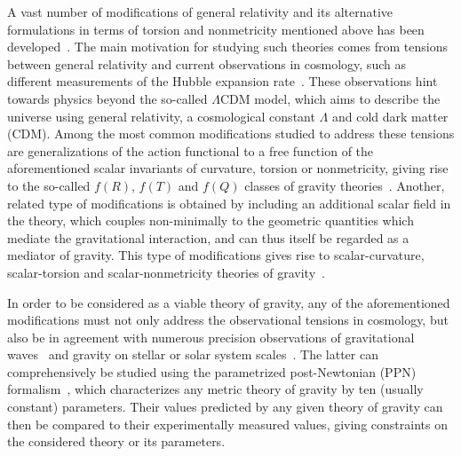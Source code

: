 \documentclass[notitlepage,a4paper,aps,prd,onecolumn,superscriptaddress,nofootinbib,groupedaddress,longbibliography]{revtex4-2}
\begin{document}
A vast number of modifications of general relativity and its alternative formulations in terms of torsion and nonmetricity mentioned above has been developed~\cite{CANTATA:2021ktz}. The main motivation for studying such theories comes from tensions between general relativity and current observations in cosmology, such as different measurements of the Hubble expansion rate~\cite{Planck:2018vyg}. These observations hint towards physics beyond the so-called $\Lambda$CDM model, which aims to describe the universe using general relativity, a cosmological constant \(\Lambda\) and cold dark matter (CDM). Among the most common modifications studied to address these tensions are generalizations of the action functional to a free function of the aforementioned scalar invariants of curvature, torsion or nonmetricity, giving rise to the so-called $f(R)$, $f(T)$ and $f(Q)$ classes of gravity theories~\cite{Sotiriou:2008rp,Bengochea:2008gz,Linder:2010py,BeltranJimenez:2017tkd,BeltranJimenez:2018vdo}. Another, related type of modifications is obtained by including an additional scalar field in the theory, which couples non-minimally to the geometric quantities which mediate the gravitational interaction, and can thus itself be regarded as a mediator of gravity. This type of modifications gives rise to scalar-curvature, scalar-torsion and scalar-nonmetricity theories of gravity~\cite{Fujii:2003pa,Geng:2011aj,Hohmann:2018rwf,Hohmann:2018vle,Hohmann:2018dqh,Hohmann:2018ijr,Jarv:2018bgs,Runkla:2018xrv}.

In order to be considered as a viable theory of gravity, any of the aforementioned modifications must not only address the observational tensions in cosmology, but also be in agreement with numerous precision observations of gravitational waves~\cite{Yagi:2016jml,Gair:2012nm,Carson:2020rea} and gravity on stellar or solar system scales~\cite{Will:2014kxa}. The latter can comprehensively be studied using the parametrized post-Newtonian (PPN) formalism~\cite{Will:1993ns,Will:2018bme}, which characterizes any metric theory of gravity by ten (usually constant) parameters. Their values predicted by any given theory of gravity can then be compared to their experimentally measured values, giving constraints on the considered theory or its parameters.
\end{document}
